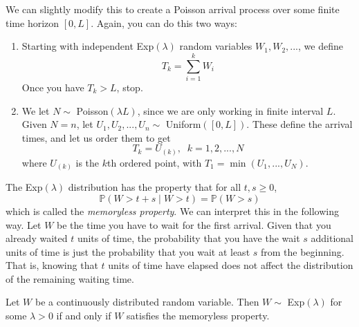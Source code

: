   We can slightly modify this to create a Poisson arrival process over some finite time horizon $[0, L]$. Again, you can do this two ways: 
  \begin{enumerate}
    \item Starting with independent Exp$(\lambda)$ random variables $W_1, W_2, ...$, we define
    \begin{equation}
      T_k = \sum_{i=1}^k W_i
    \end{equation}
    Once you have $T_k > L$, stop. 
    \item We let $N \sim$ Poisson$(\lambda L)$, since we are only working in finite interval $L$. Given $N = n$, let $U_1, U_2, ..., U_n \sim$ Uniform$([0, L])$. These define the arrival times, and let us order them to get
    \begin{equation}
      T_k = U_{(k)}, \;\; k = 1, 2, ..., N
    \end{equation}
    where $U_{(k)}$ is the $k$th ordered point, with $T_1 = \min(U_1, ..., U_N)$. 
  \end{enumerate}

  \begin{lemma}
    The Exp$(\lambda)$ distribution has the property that for all $t, s \geq 0$, 
    \begin{equation}
      \mathbb{P}(W > t + s \; | \; W > t) = \mathbb{P}(W > s)
    \end{equation}
    which is called the \textit{memoryless property}. We can interpret this in the following way. Let $W$ be the time you have to wait for the first arrival. Given that you already waited $t$ units of time, the probability that you have the wait $s$ additional units of time is just the probability that you wait at least $s$ from the beginning. That is, knowing that $t$ units of time have elapsed does not affect the distribution of the remaining waiting time. 
  \end{lemma}

  \begin{theorem}
    Let $W$ be a continuously distributed random variable. Then $W \sim$ Exp$(\lambda)$ for some $\lambda > 0$ if and only if $W$ satisfies the memoryless property. 
  \end{theorem}

